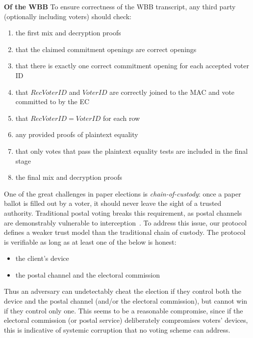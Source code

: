 \documentclass[12pt,a4paper]{article}
\theoremstyle{definition}
\newcommand{\VoterID}{\mathit{VoterID}}
\newcommand{\receivedvid}{\mathit{RecVoterID}}
\begin{document}
\textbf{Of the WBB}
To ensure correctness of the WBB transcript, any third party (optionally including voters) should check:
\begin{enumerate}
	\item the first mix and decryption proofs
	\item that the claimed commitment openings are correct openings
	\item that there is exactly one correct commitment opening for each accepted voter ID
	\item that $\receivedvid$ and $\VoterID$ are correctly joined to the MAC and vote committed to by the EC
	\item that $\receivedvid = \VoterID$ for each row
	\item any provided proofs of plaintext equality
	\item that only votes that pass the plaintext equality tests are included in the final stage
	\item the final mix and decryption proofs
\end{enumerate}
One of the great challenges in paper elections is \textit{chain-of-custody}: once a paper ballot is filled out by a voter, it should never leave the sight of a trusted authority. Traditional postal voting breaks this requirement, as postal channels are demonstrably vulnerable to interception~\cite{stewart2010losing}. To address this issue, our protocol defines a weaker trust model than the traditional chain of custody. The protocol is verifiable as long as at least one of the below is honest:
\begin{itemize}
    \item the client's device
    \item the postal channel and the electoral commission
\end{itemize}
Thus an adversary can undetectably cheat the election if they control both the device and the postal channel (and/or the electoral commission), but cannot win if they control only one. This seems to be a reasonable compromise, since if the electoral commission (or postal service) deliberately compromises voters' devices, this is indicative of systemic corruption that no voting scheme can address.
\end{document}
